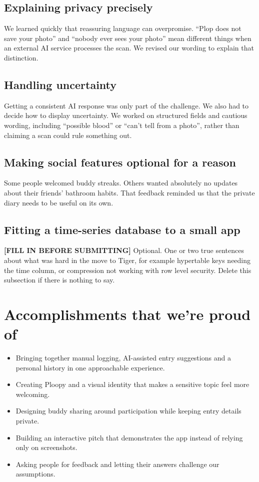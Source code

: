 \documentclass[11pt]{article}
\newcommand{\todo}[1]{\colorbox{yellow!40}{\parbox{0.92\linewidth}{\textbf{[FILL IN BEFORE SUBMITTING]} #1}}}
\begin{document}
\subsection*{Explaining privacy precisely}

We learned quickly that reassuring language can overpromise. ``Plop does not save your photo'' and ``nobody ever sees your photo'' mean different things when an external AI service processes the scan. We revised our wording to explain that distinction.

\subsection*{Handling uncertainty}

Getting a consistent AI response was only part of the challenge. We also had to decide how to display uncertainty. We worked on structured fields and cautious wording, including ``possible blood'' or ``can't tell from a photo'', rather than claiming a scan could rule something out.

\subsection*{Making social features optional for a reason}

Some people welcomed buddy streaks. Others wanted absolutely no updates about their friends' bathroom habits. That feedback reminded us that the private diary needs to be useful on its own.

\subsection*{Fitting a time-series database to a small app}

\todo{Optional. One or two true sentences about what was hard in the move to Tiger, for example hypertable keys needing the time column, or compression not working with row level security. Delete this subsection if there is nothing to say.}

\section*{Accomplishments that we're proud of}

\begin{itemize}
  \item Bringing together manual logging, AI-assisted entry suggestions and a personal history in one approachable experience.
  \item Creating Ploopy and a visual identity that makes a sensitive topic feel more welcoming.
  \item Designing buddy sharing around participation while keeping entry details private.
  \item Building an interactive pitch that demonstrates the app instead of relying only on screenshots.
  \item Asking people for feedback and letting their answers challenge our assumptions.
\end{itemize}
\end{document}
